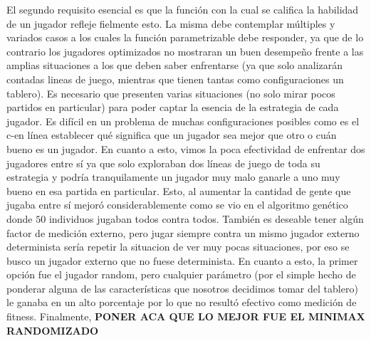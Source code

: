 \documentclass[A4paper,oneside,fleqn,11pt]{article}
\theoremstyle{definition}
\begin{document}
El segundo requisito esencial es que la función con la cual se califica la habilidad de un jugador refleje fielmente esto. La misma debe contemplar múltiples y variados casos a los cuales la función parametrizable debe responder, ya que de lo contrario los jugadores optimizados no mostraran un buen desempeño frente a las amplias situaciones a los que deben saber enfrentarse (ya que solo analizarán contadas lineas de juego, mientras que tienen tantas como configuraciones un tablero). Es necesario que presenten varias situaciones (no solo mirar pocos partidos en particular) para poder captar la esencia de la estrategia de cada jugador. Es difícil en un problema de muchas configuraciones posibles como es el c-en línea establecer qué significa que un jugador sea mejor que otro o cuán bueno es un jugador. En cuanto a esto, vimos la poca efectividad de enfrentar dos jugadores entre sí ya que solo exploraban dos líneas de juego de toda su estrategia y podría tranquilamente un jugador muy malo ganarle a uno muy bueno en esa partida en particular. Esto, al aumentar la cantidad de gente que jugaba entre sí mejoró considerablemente como se vio en el algoritmo genético donde $50$ individuos jugaban todos contra todos. También es deseable tener algún factor de medición externo, pero jugar siempre contra un mismo jugador externo determinista sería repetir la situacion de ver muy pocas situaciones, por eso se busco un jugador externo que no fuese determinista. En cuanto a esto, la primer opción fue el jugador random, pero cualquier parámetro (por el simple hecho de ponderar alguna de las características que nosotros decidimos tomar del tablero) le ganaba en un alto porcentaje por lo que no resultó efectivo como medición de fitness. Finalmente,
\textbf{PONER ACA QUE LO MEJOR FUE EL MINIMAX RANDOMIZADO}
\end{document}
